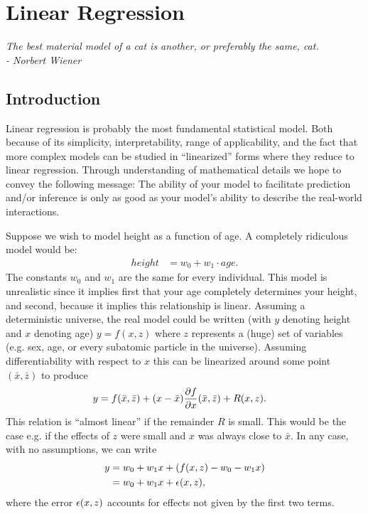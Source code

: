 \chapter{Linear Regression}
\label{chapter:linear}
\begin{center}
  {\Large\textit{The best material model of a cat is another, or preferably the same, cat.\\ \vspace{0.1in} - Norbert Wiener}}
\end{center}
\vspace{0.2in}

\section{Introduction}
Linear regression is probably the most fundamental statistical model.  Both because of its simplicity, interpretability, range of applicability, and the fact that more complex models can be studied in ``linearized'' forms where they reduce to linear regression.  Through understanding of mathematical details we hope to convey the following message:  The ability of your model to facilitate prediction and/or inference is only as good as your model's ability to describe the real-world interactions.  

Suppose we wish to model height as a function of age.  A completely ridiculous model would be:
\begin{align*}
  height &= w_0  + w_1 \cdot age.
\end{align*}
The constants $w_0$ and $w_1$ are the same for every individual.  This model is unrealistic since it implies first that your age completely determines your height, and second, because it implies this relationship is linear.  Assuming a deterministic universe, the real model could be written (with $y$ denoting height and $x$ denoting age) $y = f(x, z)$ where $z$ represents a (huge) set of variables (e.g. sex, age, or every subatomic particle in the universe).  Assuming differentiability with respect to $x$ this can be linearized around some point $(\bar x, \bar z)$ to produce
\begin{align*}
    y &= f(\bar x, \bar z) + (x-\bar x)\frac{\partial f}{\partial x}(\bar x, \bar z) + R(x, z).
\end{align*}
This relation is ``almost linear'' if the remainder $R$ is small.  This would be the case e.g. if the effects of $z$ were small and $x$ was always close to $\bar x$.
In any case, with no assumptions, we can write
\begin{align}
  \begin{split}
    y &= w_0 + w_1 x + (f(x,z) - w_0 - w_1 x)\\
    &= w_0 + w_1 x + {\epsilon}(x,z),
  \end{split}
  \label{linear:align:error-decomposition}
\end{align}
where the error ${\epsilon}(x,z)$ accounts for effects not given by the first two terms.  

